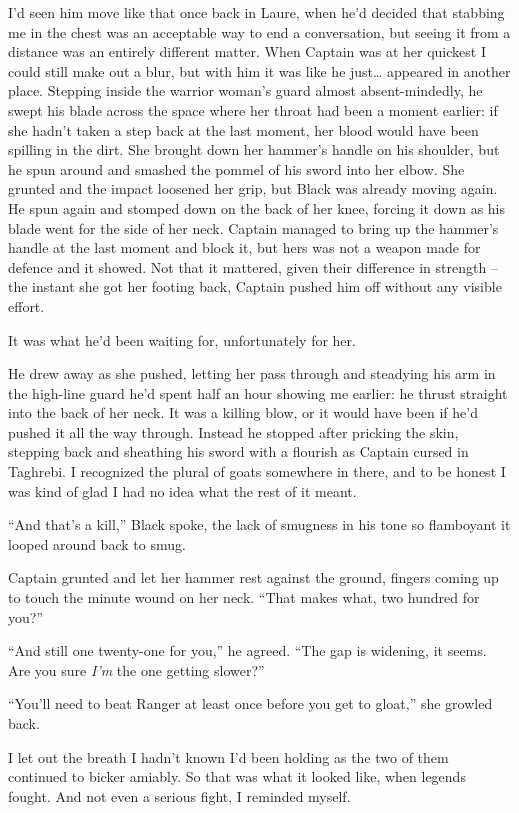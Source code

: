 \documentclass[12pt, openany]{book}
\begin{document}
I’d seen him move like that once back in Laure, when he’d decided that stabbing me in the chest was an acceptable way to end a conversation, but seeing it from a distance was an entirely different matter. When Captain was at her quickest I could still make out a blur, but with him it was like he just… appeared in another place. Stepping inside the warrior woman’s guard almost absent-mindedly, he swept his blade across the space where her throat had been a moment earlier: if she hadn’t taken a step back at the last moment, her blood would have been spilling in the dirt. She brought down her hammer’s handle on his shoulder, but he spun around and smashed the pommel of his sword into her elbow. She grunted and the impact loosened her grip, but Black was already moving again. He spun again and stomped down on the back of her knee, forcing it down as his blade went for the side of her neck. Captain managed to bring up the hammer’s handle at the last moment and block it, but hers was not a weapon made for defence and it showed. Not that it mattered, given their difference in strength – the instant she got her footing back, Captain pushed him off without any visible effort.

It was what he’d been waiting for, unfortunately for her.

He drew away as she pushed, letting her pass through and steadying his arm in the high-line guard he’d spent half an hour showing me earlier: he thrust straight into the back of her neck. It was a killing blow, or it would have been if he’d pushed it all the way through. Instead he stopped after pricking the skin, stepping back and sheathing his sword with a flourish as Captain cursed in Taghrebi. I recognized the plural of goats somewhere in there, and to be honest I was kind of glad I had no idea what the rest of it meant.

“And that’s a kill,” Black spoke, the lack of smugness in his tone so flamboyant it looped around back to smug.

Captain grunted and let her hammer rest against the ground, fingers coming up to touch the minute wound on her neck. “That makes what, two hundred for you?”

“And still one twenty-one for you,” he agreed. “The gap is widening, it seems. Are you sure \textit{I’m} the one getting slower?”

“You’ll need to beat Ranger at least once before you get to gloat,” she growled back.

I let out the breath I hadn’t known I’d been holding as the two of them continued to bicker amiably. So that was what it looked like, when legends fought. And not even a serious fight, I reminded myself.
\end{document}
